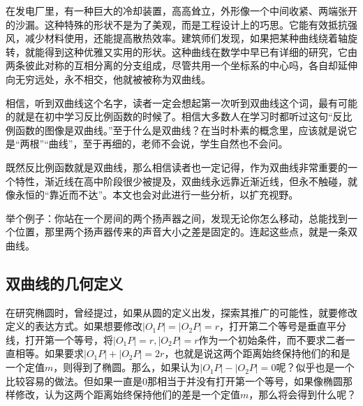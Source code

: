 
\begin{issues}
\issueDraft
\end{issues}


在发电厂里，有一种巨大的冷却装置，高高耸立，外形像一个中间收紧、两端张开的沙漏。这种特殊的形状不是为了美观，而是工程设计上的巧思。它能有效抵抗强风，减少材料使用，还能提高散热效率。建筑师们发现，如果把某种曲线绕着轴旋转，就能得到这种优雅又实用的形状。这种曲线在数学中早已有详细的研究，它由两条彼此对称的互相分离的分支组成，尽管共用一个坐标系的中心吗，各自却延伸向无穷远处，永不相交，他就被被称为双曲线。

相信，听到双曲线这个名字，读者一定会想起第一次听到双曲线这个词，最有可能的就是在初中学习反比例函数的时候了。相信大多数人在学习时都听过这句“反比例函数的图像是双曲线。”至于什么是双曲线？在当时朴素的概念里，应该就是说它是“两根”“曲线”，至于再细的，老师不会说，学生自然也不会问。

既然反比例函数就是双曲线，那么相信读者也一定记得，作为双曲线非常重要的一个特性，渐近线在高中阶段很少被提及，双曲线永远靠近渐近线，但永不触碰，就像永恒的“靠近而不达”。本文也会对此进行一些分析，以扩充视野。

举个例子：你站在一个房间的两个扬声器之间，发现无论你怎么移动，总能找到一个位置，那里两个扬声器传来的声音大小之差是固定的。连起这些点，就是一条双曲线。

\subsection{双曲线的几何定义}

在研究椭圆时，曾经提过，如果从圆的定义出发，探索其推广的可能性，就要修改定义的表达方式。如果想要修改$|O_1P|=|O_2P|=r$，打开第二个等号是垂直平分线，打开第一个等号，将$|O_1P|=r,|O_2P|=r$作为一个初始条件，而不要求二者一直相等。如果要求$|O_1P|+|O_2P|=2r$，也就是说这两个距离始终保持他们的和是一个定值$m$，则得到了椭圆。那么，如果认为$|O_1P|-|O_2P|=0$呢？似乎也是一个比较容易的做法。但如果一直是$0$那相当于并没有打开第一个等号，如果像椭圆那样修改，认为这两个距离始终保持他们的差是一个定值$m$，那么将会得到什么呢？


